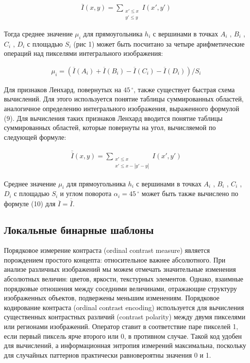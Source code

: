 \begin{gather}
\overline{I}(x,y) = \sum\limits_{\substack{x' \le x\\y' \le y}} I(x',y')
\end{gather}

Тогда среднее значение $\mu_i$ для прямоугольника $h_i$ с вершинами в точках $A_i$ , $B_i$ , $C_i$ , $D_i$ с площадью $S_i$ (рис 1) может быть посчитано за четыре арифметические операций над пикселями интегрального изображения:

\begin{gather}
\mu_i = (\overline{I}(A_i) + \overline{I}(B_i) - \overline{I}(C_i) - \overline{I}(D_i)) / S_i
\end{gather}

Для признаков Ленхард, повернутых на $45\,^{\circ}$, также существует быстрая схема вычислений. Для этого используется понятие таблицы суммированных областей, аналогичное определению интегрального изображения, выраженного формулой (9). Для вычисления таких признаков Ленхард вводится понятие таблицы суммированных областей, которые повернуты на угол, вычисляемой по следующей формуле:

\begin{gather}
\overline{\overline{I}}(x,y) = \sum\limits_{\substack{x' \le x\\x' \le x - |y' - y|}} I(x',y')
\end{gather}

Среднее значение $\mu_i$ для прямоугольника $h_i$ с вершинами в точках $A_i$ , $B_i$ , $C_i$ , $D_i$ с площадью $S_i$ и углом поворота $\alpha_i = 45\,^{\circ}$ может быть также вычислено по формуле (10) для $\overline{I} = \overline{\overline{I}}$.

\subsection{Локальные бинарные шаблоны}

Порядковое измерение контраста (ordinal contrast measure) является порождением простого концепта: относительное важнее абсолютного. При анализе различных изображений мы можем отмечать значительные изменения абсолютных величин: цветов, яркости, текстурных элементов. Однако, взаимные порядковые отношения между соседними величинами, отражающие структуру изображенных объектов, подвержены меньшим изменениям. Порядковое кодирование контраста (ordinal contrast encoding) используется для вычисления существенных контрастных различий (contrast polarity) между двумя пикселями или регионами изображений. Оператор ставит в соответствие паре пикселей 1, если первый пиксель ярче второго или 0, в противном случае. Такой код удобен для вычислений, а информационная энтропия измерений максимальна, поскольку для случайных паттернов практически равновероятны значения 0 и 1.

